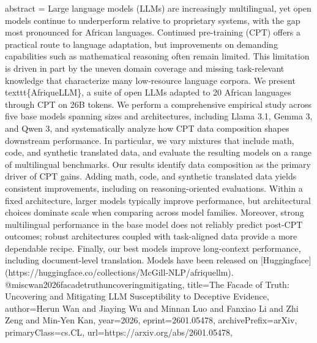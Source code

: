 {      abstract = {Large language models (LLMs) are increasingly multilingual, yet open models continue to underperform relative to proprietary systems, with the gap most pronounced for African languages. Continued pre-training (CPT) offers a practical route to language adaptation, but improvements on demanding capabilities such as mathematical reasoning often remain limited. This limitation is driven in part by the uneven domain coverage and missing task-relevant knowledge that characterize many low-resource language corpora. We present \\texttt\{AfriqueLLM\}, a suite of open LLMs adapted to 20 African languages through CPT on 26B tokens. We perform a comprehensive empirical study across five base models spanning sizes and architectures, including Llama 3.1, Gemma 3, and Qwen 3, and systematically analyze how CPT data composition shapes downstream performance. In particular, we vary mixtures that include math, code, and synthetic translated data, and evaluate the resulting models on a range of multilingual benchmarks. Our results identify data composition as the primary driver of CPT gains. Adding math, code, and synthetic translated data yields consistent improvements, including on reasoning-oriented evaluations. Within a fixed architecture, larger models typically improve performance, but architectural choices dominate scale when comparing across model families. Moreover, strong multilingual performance in the base model does not reliably predict post-CPT outcomes; robust architectures coupled with task-aligned data provide a more dependable recipe. Finally, our best models improve long-context performance, including document-level translation. Models have been released on [Huggingface](https://huggingface.co/collections/McGill-NLP/afriquellm).}
}@misc{wan2026facadetruthuncoveringmitigating,
      title={The Facade of Truth: Uncovering and Mitigating LLM Susceptibility to Deceptive Evidence}, 
      author={Herun Wan and Jiaying Wu and Minnan Luo and Fanxiao Li and Zhi Zeng and Min-Yen Kan},
      year={2026},
      eprint={2601.05478},
      archivePrefix={arXiv},
      primaryClass={cs.CL},
      url={https://arxiv.org/abs/2601.05478},
}

